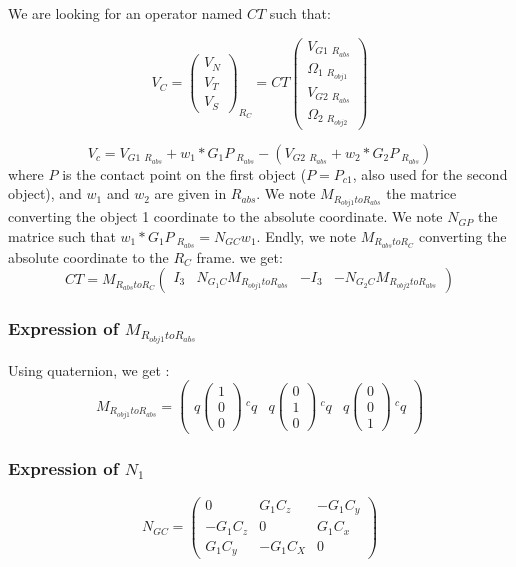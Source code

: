 We are looking for an operator named $CT$ such that:

\[V_C=\left(\begin{array}{c} V_N \\ V_T \\ V_S \end{array}\right)_{R_{C}}=CT \left(\begin{array}{c} V_{G1}~_{R_{abs}} \\ \Omega_1~_{R_{obj1}} \\ V_{G2}~_{R_{abs}}\\ \Omega_2~_{R_{obj2}} \end{array}\right)\]

\[V_c=V_{G1}~_{R_{abs}} + w_1 * G_1P~_{R_{abs}} -(V_{G2}~_{R_{abs}} + w_2 * G_2P~_{R_{abs}})\]
where $P$ is the contact point on the first object ($P = P_{c1}$, also used for the second object), and $w_1$ and $w_2$ are given in $R_{abs}$. We note $M_{R_{obj1}toR_{abs}}$ the matrice converting the object 1 coordinate to the absolute coordinate. We note $N_{GP}$ the matrice such that $w_1*G_1P~_{R_{abs}} = N_{GC} w_1$. Endly, we note $M_{R_{abs}toR_C}$ converting the absolute coordinate to the $R_C$ frame.
we get:
\[CT= M_{R_{abs}toR_C}   \left(\begin{array}{cccc} I_3 & N_{G_1C}M_{R_{obj1}toR_{abs}} & -I_3 & -N_{G_2C}M_{R_{obj2}toR_{abs}} \end{array}\right)\]

\subsubsection{Expression of $M_{R_{obj1}toR_{abs}}$}
Using quaternion, we get :
\begin{equation}
  \label{eq:newton_Mobjtoabs}
M_{R_{obj1}toR_{abs}} = \left(\begin{array}{ccc} q \left(\begin{array}{c}1\\0\\0 \end{array}\right)~^cq & q \left(\begin{array}{c}  0\\1\\0 \end{array}\right)~ ^cq & q \left(\begin{array}{c}  0\\0\\1 \end{array}\right)~ ^cq  \end{array}\right)
\end{equation}

\subsubsection{Expression of $N_1$}
\[N_{GC}=\left(\begin{array}{ccc} 0&G_1C_z&-G_1C_y\\-G_1C_z&0&G_1C_x\\G_1C_y&-G_1C_X&0\end{array}\right)\]

